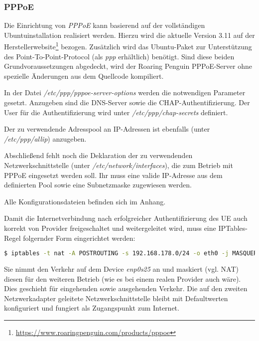     	\clearpage
    	\subsubsection[PPPoE (Schenkel)]{PPPoE}
    	Die Einrichtung von \textit{PPPoE} kann basierend auf der vollständigen Ubuntuinstallation realisiert werden. Hierzu wird die aktuelle
    	Version 3.11 auf der Herstellerwebsite\footnote{\url{https://www.roaringpenguin.com/products/pppoe}}
    	bezogen. Zusätzlich wird das Ubuntu-Paket zur Unterstützung
    	des Point-To-Point-Protocol (als \textit{ppp} erhältlich) benötigt. Sind diese beiden Grundvoraussetzungen
    	abgedeckt, wird der Roaring Penguin PPPoE-Server ohne spezielle Änderungen aus dem Quellcode kompiliert.

    	In der Datei \textit{/etc/ppp/pppoe-server-options} werden die notwendigen Parameter gesetzt. Anzugeben
    	sind die DNS-Server sowie die CHAP-Authentifizierung. Der User für die Authentifizierung
    	wird unter \textit{/etc/ppp/chap-secrets} definiert.

    	Der zu verwendende Adresspool an IP-Adressen ist ebenfalls (unter \textit{/etc/ppp/allip}) anzugeben.

    	Abschließend fehlt noch die Deklaration der zu verwendenden Netzwerkschnittstelle (unter \textit{/etc/network/interfaces}),
    	die zum Betrieb mit PPPoE eingesetzt werden soll. Ihr muss eine valide IP-Adresse aus dem definierten
    	Pool sowie eine Subnetzmaske zugewiesen werden.

    	Alle Konfigurationsdateien befinden sich im Anhang. %

    	Damit die Internetverbindung nach erfolgreicher Authentifizierung des UE auch
    	korrekt von Provider freigeschaltet und weitergeleitet wird, muss eine IPTables-Regel
    	folgernder Form eingerichtet werden:

    	\begin{lstlisting}[language=bash]
		$ iptables -t nat -A POSTROUTING -s 192.168.178.0/24 -o eth0 -j MASQUERADE
	\end{lstlisting}

	Sie nimmt den Verkehr auf dem Device \textit{enp0s25} an und maskiert (vgl. \ac{NAT}) diesen
	für den weiteren Betrieb (wie es bei einem realen Provider auch wäre). Dies geschieht
	für eingehenden sowie ausgehenden Verkehr. Die auf den zweiten Netzwerkadapter geleitete
	Netzwerkschnittstelle bleibt mit Defaultwerten konfiguriert und fungiert als Zugangspunkt
	zum Internet.

